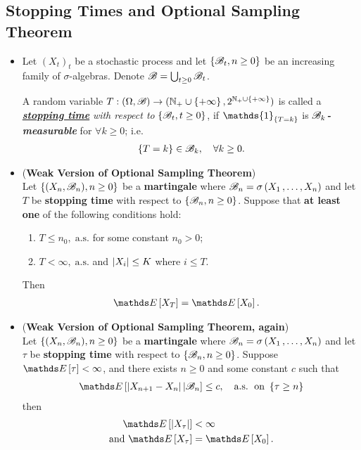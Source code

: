 \documentclass[11pt]{article}
\begin{document}
\subsection{Stopping Times and Optional Sampling Theorem}
\begin{itemize}
\item \begin{definition}
Let $(X_t)_t$ be a stochastic process and let $\left\{{\mathscr B}_t, n\ge 0\right\}$ be an increasing family of $\sigma$-algebras. Denote ${\mathscr B} = \bigcup_{t\ge 0} {\mathscr B}_t$.

A random variable $T: (\Omega, {\mathscr B}) \rightarrow ({\mathbb N}_{+}\cup\left\{+\infty\right\}, 2^{{\mathbb N}_{+}\cup\left\{+\infty\right\}})$ is called a \underline{\textbf{\emph{stopping time}}} \emph{with respect to} $\left\{{\mathscr B}_t, t\ge 0\right\}$, if $\mathds{1}_{\set{T = k}}$ is \textbf{\emph{${\mathscr B}_k$-measurable}} for $\forall k \ge 0$; i.e.
\begin{align*}
\left\{T = k\right\} \in {\mathscr B}_{k}, \quad \forall k \ge 0.
\end{align*}
\end{definition}


\item \begin{theorem}(\textbf{Weak Version of Optional Sampling Theorem}) \citep{billingsley2008probability}\\
Let $\left\{(X_n, {\mathscr B}_n), n \ge 0\right\}$ be a \textbf{martingale} where ${\mathscr B}_n = \sigma\left(X_1 \,{,}\ldots{,}\, X_n\right)$ and let $T$ be \textbf{stopping time} with respect to $\left\{{\mathscr B}_n, n \ge 0\right\}$. Suppose that \textbf{at least one} of the following conditions hold:
\begin{enumerate}
\item $T \le n_0,\; \text{a.s.}$ for some constant $n_0 >0$;
\item $T < \infty,\; \text{a.s.}$ and $\left\lvert X_i \right\rvert \le K$ where $i \le T$.
\end{enumerate} Then 
\begin{align*}
\E{}{X_T} &= \E{}{X_0}.
\end{align*} 
\end{theorem}

\item \begin{theorem}(\textbf{Weak Version of Optional Sampling Theorem, again}) \citep{billingsley2008probability}\\
Let $\left\{(X_n, {\mathscr B}_n), n \ge 0\right\}$ be a \textbf{martingale} where ${\mathscr B}_n = \sigma\left(X_1 \,{,}\ldots{,}\, X_n\right)$ and let $\tau$ be \textbf{stopping time} with respect to $\left\{{\mathscr B}_n, n \ge 0\right\}$. Suppose $\E{}{\tau} < \infty$, and there exists $n \ge 0$ and some constant $c$ such that 
\begin{align*}
\E{}{\abs{X_{n+1} - X_n} | \srB_n} \le c, \quad \text{a.s.} \; \text{ on }\set{\tau \ge n}
\end{align*}
 then 
\begin{align*}
\E{}{\abs{X_{\tau}}} &< \infty\\
\text{and }\E{}{X_\tau} &= \E{}{X_0}.
\end{align*} 
\end{theorem}



\end{itemize}
\end{document}
